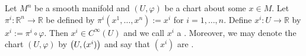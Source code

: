 \begin{example}
	Let $M^n$ be a smooth manifold and $(U,\varphi)$ be a chart about some $x \in M$. Let $\pi^i : \mathbb{R}^n \to \mathbb{R}$ be defined by $\pi^i(x^1,\dots,x^n) := x^i$ for $i = 1,\dots,n$. Define $x^i : U \to \mathbb{R}$ by $x^i := \pi^i \circ \varphi$. Then $x^i \in C^\infty(U)$ and we call $x^i$ a . Moreover, we may denote the chart $(U,\varphi)$ by $\del[1]{U,(x^i)}$ and say that $(x^i)$ are . 
\end{example}

